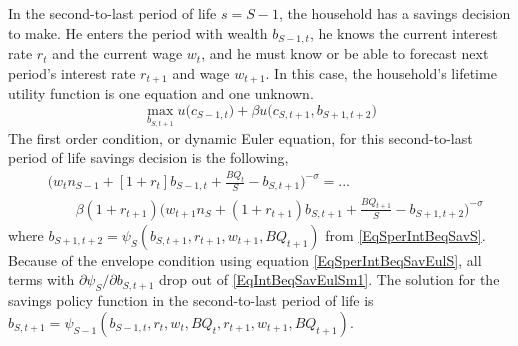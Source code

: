 \documentclass[letterpaper,12pt]{article}
\theoremstyle{definition}
\numberwithin{equation}{section}
\numberwithin{exercise}{section}
\begin{document}
\begin{spacing}{1.5}
      In the second-to-last period of life $s=S-1$, the household has a savings decision to make. He enters the period with wealth $b_{S-1,t}$, he knows the current interest rate $r_t$ and the current wage $w_t$, and he must know or be able to forecast next period's interest rate $r_{t+1}$ and wage $w_{t+1}$. In this case, the household's lifetime utility function is one equation and one unknown.
      \begin{equation}\label{EqIntBeqlifutSm1}
         \max_{b_{S,t+1}} u\bigl(c_{S-1,t}\bigr) + \beta u\bigl(c_{S,t+1},b_{S+1,t+2}\bigr)
      \end{equation}
      The first order condition, or dynamic Euler equation, for this second-to-last period of life savings decision is the following,
      \begin{equation}\label{EqIntBeqSavEulSm1}
         \begin{split}
            &\biggl(w_t n_{S-1} + [1 + r_{t}]b_{S-1,t} + \frac{BQ_t}{S} - b_{S,t+1}\biggr)^{-\sigma} = ... \\
            &\qquad \beta(1+r_{t+1})\biggl(w_{t+1}n_S + (1 + r_{t+1})b_{S,t+1} + \frac{BQ_{t+1}}{S} - b_{S+1,t+2}\biggr)^{-\sigma}
         \end{split}
      \end{equation}
      where $b_{S+1,t+2}=\psi_S\left(b_{S,t+1},r_{t+1},w_{t+1},BQ_{t+1}\right)$ from \eqref{EqSperIntBeqSavS}. Because of the envelope condition using equation \eqref{EqSperIntBeqSavEulS}, all terms with $\partial\psi_S/\partial b_{S,t+1}$ drop out of \eqref{EqIntBeqSavEulSm1}. The solution for the savings policy function in the second-to-last period of life is $b_{S,t+1}=\psi_{S-1}\left(b_{S-1,t},r_t,w_t,BQ_t,r_{t+1},w_{t+1},BQ_{t+1}\right)$.


\end{spacing}
\end{document}
